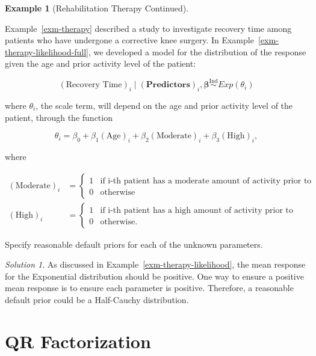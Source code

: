 \documentclass[
  letterpaper,
  DIV=11,
  numbers=noendperiod]{scrreprt}
\theoremstyle{definition}
\newtheorem{example}{Example}[chapter]
\theoremstyle{definition}
\theoremstyle{plain}
\theoremstyle{remark}
\newtheorem*{solution}{Solution}
\begin{document}
\begin{example}[Rehabilitation Therapy
Continued]\protect\hypertarget{exm-therapy-prior}{}\label{exm-therapy-prior}

Example~\ref{exm-therapy} described a study to investigate recovery time
among patients who have undergone a corrective knee surgery. In
Example~\ref{exm-therapy-likelihood-full}, we developed a model for the
distribution of the response given the age and prior activity level of
the patient:

\[(\text{Recovery Time})_i \mid (\mathbf{Predictors})_i, \boldsymbol{\beta} \stackrel{\text{Ind}}{\sim}Exp\left(\theta_i\right)\]

where \(\theta_i\), the scale term, will depend on the age and prior
activity level of the patient, through the function

\[\theta_i = \beta_0 + \beta_1 (\text{Age})_i + \beta_2 (\text{Moderate})_i + \beta_3 (\text{High})_i,\]

where

\[
\begin{aligned}
  (\text{Moderate})_i 
    &= \begin{cases} 1 & \text{if i-th patient has a moderate amount of activity prior to surgery} \\ 0 & \text{otherwise} \end{cases} \\
  (\text{High})_i
    &= \begin{cases} 1 & \text{if i-th patient has a high amount of activity prior to surgery} \\ 0 & \text{otherwise}. \end{cases}
\end{aligned}
\]

Specify reasonable default priors for each of the unknown parameters.

\end{example}

\begin{solution}

As discussed in Example~\ref{exm-therapy-likelihood}, the mean response
for the Exponential distribution should be positive. One way to ensure a
positive mean response is to ensure each parameter is positive.
Therefore, a reasonable default prior could be a Half-Cauchy
distribution.

\end{solution}

\hypertarget{sec-qr-factorization}{%
\chapter{QR Factorization}\label{sec-qr-factorization}}
\end{document}
